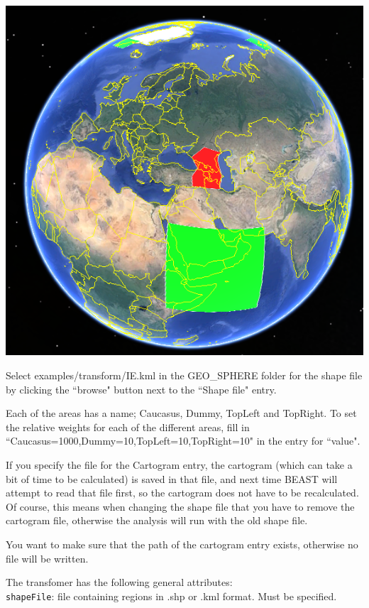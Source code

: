 \documentclass{article}
\def\beast-geo{GEO\_SPHERE}
\begin{document}
\begin{center}
\includegraphics[scale=0.4]{figures/IEmap.png}
\end{center}

Select examples/transform/IE.kml in the \beast-geo{} folder for the shape file by clicking the ``browse" button next to the ``Shape file" entry.

Each of the areas has a name; Caucasus, Dummy, TopLeft and TopRight. To set the relative weights for each of the different areas, fill in\\ ``Caucasus=1000,Dummy=10,TopLeft=10,TopRight=10" in the entry for ``value". 

If you specify the file for the Cartogram entry, the cartogram (which can take a bit of time to be calculated) is saved in that file, and next time BEAST will attempt to read that file first, so the cartogram does not have to be recalculated. Of course, this means when changing the shape file that you have to remove the cartogram file, otherwise the analysis will run with the old shape file.

You want to make sure that the path of the cartogram entry exists, otherwise no file will be written. 

The transfomer has the following general attributes:\\

{\tt shapeFile}: file containing regions in .shp or .kml format. Must be specified.\\
\end{document}
